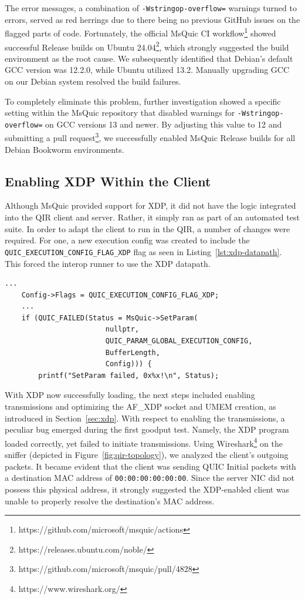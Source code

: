 The error messages, a combination of \texttt{-Wstringop-overflow=} warnings turned to errors, served as red herrings due to there being no previous GitHub issues on the flagged parts of code. Fortunately, the official MsQuic \ac{CI} workflow\footnote{https://github.com/microsoft/msquic/actions} showed successful Release builds on Ubuntu 24.04\footnote{https://releases.ubuntu.com/noble/}, which strongly suggested the build environment as the root cause. We subsequently identified that Debian's default \ac{GCC} version was 12.2.0, while Ubuntu utilized 13.2. Manually upgrading \ac{GCC} on our Debian system resolved the build failures.

To completely eliminate this problem, further investigation showed a specific setting within the MsQuic repository that disabled warnings for \texttt{-Wstringop-overflow=} on \ac{GCC} versions 13 and newer. By adjusting this value to 12 and submitting a pull request\footnote{https://github.com/microsoft/msquic/pull/4828}, we successfully enabled MsQuic Release builds for all Debian Bookworm environments.

\subsection{Enabling XDP Within the Client}
\label{subsec:enabling-xdp-within-quicinterop-client}
Although MsQuic provided support for \ac{XDP}, it did not have the logic integrated into the \ac{QIR} client and server. Rather, it simply ran as part of an automated test suite. In order to adapt the client to run in the \ac{QIR}, a number of changes were required. For one, a new execution config was created to include the \texttt{QUIC\_EXECUTION\_CONFIG\_FLAG\_XDP} flag as seen in Listing~\ref{lst:xdp-datapath}. This forced the interop runner to use the \ac{XDP} datapath.

\begin{lstlisting}[caption={Enabling the XDP Datapath}, label={lst:xdp-datapath}]
    ...
    Config->Flags = QUIC_EXECUTION_CONFIG_FLAG_XDP;
    ...
    if (QUIC_FAILED(Status = MsQuic->SetParam(
                        nullptr,
                        QUIC_PARAM_GLOBAL_EXECUTION_CONFIG,
                        BufferLength,
                        Config))) {
        printf("SetParam failed, 0x%x!\n", Status);
\end{lstlisting}

With \ac{XDP} now successfully loading, the next steps included enabling transmissions and optimizing the AF\_XDP socket and UMEM creation, as introduced in Section~\ref{sec:xdp}. With respect to enabling the transmissions, a peculiar bug emerged during the first goodput test. Namely, the \ac{XDP} program loaded correctly, yet failed to initiate transmissions. Using Wireshark\footnote{https://www.wireshark.org/} on the sniffer (depicted in Figure~\ref{fig:qir-topology}), we analyzed the client's outgoing packets. It became evident that the client was sending QUIC Initial packets with a destination MAC address of \texttt{00:00:00:00:00:00}. Since the server \ac{NIC} did not possess this physical address, it strongly suggested the \ac{XDP}-enabled client was unable to properly resolve the destination's MAC address.

